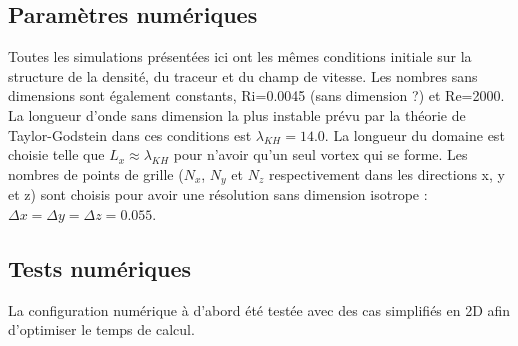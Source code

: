 \documentclass[a4paper,12pt]{article}
\begin{document}
    \subsection{Paramètres numériques}
    
    
    Toutes les simulations présentées ici ont les mêmes conditions initiale sur la structure de la densité, du traceur et du champ de vitesse. Les nombres sans dimensions sont également constants, Ri=0.0045 (sans dimension ?) et Re=2000. La longueur d'onde sans dimension la plus instable prévu par la théorie de Taylor-Godstein dans ces conditions est $\lambda_{KH}=14.0$. La longueur du domaine est choisie telle que $L_x\approx \lambda_{KH}$ pour n'avoir qu'un seul vortex qui se forme. Les nombres de points de grille ($N_x$, $N_y$ et $N_z$ respectivement dans les directions x, y et z) sont choisis pour avoir une résolution sans dimension isotrope : $\Delta x=\Delta y=\Delta z=0.055$. %
    \subsection{Tests numériques}
    
    \color{blue}
    La configuration numérique à d'abord été testée avec des cas simplifiés en 2D afin d'optimiser le temps de calcul. \\
    \color{black}
     \\
   
\end{document}

